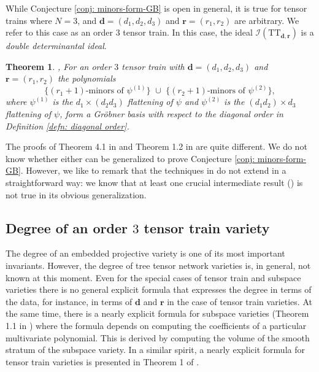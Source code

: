\documentclass[12pt]{article}
\newtheorem{theorem}{Theorem}
\theoremstyle{definition}
\numberwithin{theorem}{section}
\begin{document}
While Conjecture \ref{conj: minors-form-GB} is open in general, it is true for tensor trains where $N=3$, and 
$\mathbf{d}=(d_1, d_2, d_3)$ and $\mathbf{r} = (r_1, r_2)$ are arbitrary. We refer to this case as an order $3$ tensor train. In this case, the ideal $\mathcal{I}(\mathrm{TT}_{\mathbf{d}, \mathbf{r}})$ is a \emph{double determinantal ideal}.
\begin{theorem} \label{thm: order-3-GB}
\cite[Theorem 4.1]{FK20}, \cite[Theorem 1.2]{illian2025grobner} For an order $3$ tensor train with $\mathbf{d} = (d_1,d_2,d_3)$ and $\mathbf{r} = (r_1, r_2)$ the polynomials
\begin{equation*}
    \{(r_1+1)\text{-minors of } \psi^{(1)} \} \,\, \cup \, \, 
\{(r_2+1)\text{-minors of } \psi^{(2)} \},
\end{equation*}
where $\psi^{(1)}$ is the $d_1 \times (d_2d_3)$ flattening of $\psi$ and $\psi^{(2)}$ is the $(d_1d_2) \times d_3$ flattening of $\psi$, form a Gr\"obner basis with respect to the diagonal order in Definition \ref{defn: diagonal order}. 
\end{theorem}

The proofs of Theorem 4.1 in \cite{FK20} and Theorem 1.2 in \cite{illian2025grobner} are quite different. We do not know whether either can be generalized to prove Conjecture \ref{conj: minors-form-GB}. However, we like to remark that the techniques in \cite{illian2025grobner} do not extend in a straightforward way: we know that at least one crucial intermediate result (\cite[Lemma 2.12]{illian2025grobner}) is not true in its obvious generalization. 

\subsection{Degree of an order $3$ tensor train variety}
The degree of an embedded projective variety is one of its most important invariants. However, the degree of tree tensor network varieties is, in general, not known at this moment. Even for the special cases of tensor train and subspace varieties there is no general explicit formula that expresses the degree in terms of the data, for instance,  in terms of $\mathbf{d}$ and $\mathbf{r}$ in the case of tensor train varieties. At the same time, there is a nearly explicit formula for subspace varieties (Theorem 1.1 in \cite{Breiding_2024}) where the formula depends on computing the coefficients of a particular multivariate polynomial. This is derived by computing the volume of the smooth stratum of the subspace variety. In a similar spirit, a nearly explicit formula for tensor train varieties is presented in Theorem 1 of \cite{RS26}. 
\end{document}
